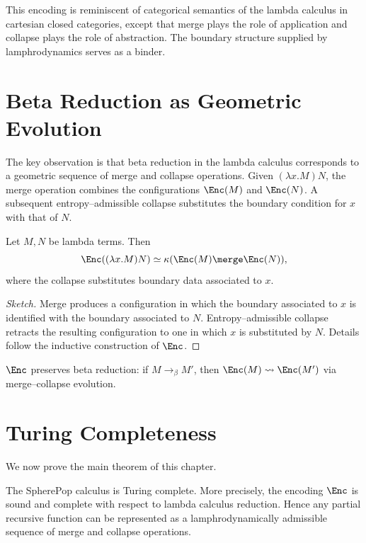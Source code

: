 \begin{remark}
This encoding is reminiscent of categorical semantics of the lambda
calculus in cartesian closed categories, except that merge plays the
role of application and collapse plays the role of abstraction. The
boundary structure supplied by lamphrodynamics serves as a binder.
\end{remark}


\section{Beta Reduction as Geometric Evolution}

The key observation is that beta reduction in the lambda calculus
corresponds to a geometric sequence of merge and collapse operations.
Given $(\lambda x.M)N$, the merge operation combines the configurations
$\Enc(M)$ and $\Enc(N)$. A subsequent entropy--admissible collapse
substitutes the boundary condition for $x$ with that of $N$.

\begin{proposition}
Let $M,N$ be lambda terms. Then
\[
  \Enc((\lambda x.M)N) \simeq
  \Collapse(\Enc(M)\merge\Enc(N)),
\]
where the collapse substitutes boundary data associated to $x$.
\end{proposition}

\begin{proof}[Sketch]
Merge produces a configuration in which the boundary associated to $x$
is identified with the boundary associated to $N$. Entropy--admissible
collapse retracts the resulting configuration to one in which $x$ is
substituted by $N$. Details follow the inductive construction of $\Enc$.
\end{proof}

\begin{corollary}
$\Enc$ preserves beta reduction: if $M\to_\beta M'$, then
$\Enc(M)\rightsquigarrow\Enc(M')$ via merge--collapse evolution.
\end{corollary}


\section{Turing Completeness}

We now prove the main theorem of this chapter.

\begin{theorem}
\label{thm:spherepop-turing}
The SpherePop calculus is Turing complete. More precisely, the encoding
$\Enc$ is sound and complete with respect to lambda calculus reduction.
Hence any partial recursive function can be represented as a
lamphrodynamically admissible sequence of merge and collapse operations.
\end{theorem}

